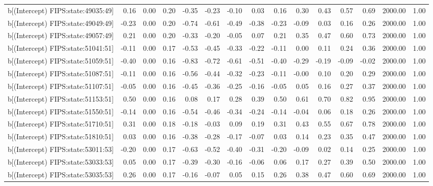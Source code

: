 \begin{table}[ht]
\begin{tabular}{rrrrrrrrrrrrrrr}
  b[(Intercept) FIPS:state:49035:49] & 0.16 & 0.00 & 0.20 & -0.35 & -0.23 & -0.10 & 0.03 & 0.16 & 0.30 & 0.43 & 0.57 & 0.69 & 2000.00 & 1.00 \\ 
  b[(Intercept) FIPS:state:49049:49] & -0.23 & 0.00 & 0.20 & -0.74 & -0.61 & -0.49 & -0.38 & -0.23 & -0.09 & 0.03 & 0.16 & 0.26 & 2000.00 & 1.00 \\ 
  b[(Intercept) FIPS:state:49057:49] & 0.21 & 0.00 & 0.20 & -0.33 & -0.20 & -0.05 & 0.07 & 0.21 & 0.35 & 0.47 & 0.60 & 0.73 & 2000.00 & 1.00 \\ 
  b[(Intercept) FIPS:state:51041:51] & -0.11 & 0.00 & 0.17 & -0.53 & -0.45 & -0.33 & -0.22 & -0.11 & 0.00 & 0.11 & 0.24 & 0.36 & 2000.00 & 1.00 \\ 
  b[(Intercept) FIPS:state:51059:51] & -0.40 & 0.00 & 0.16 & -0.83 & -0.72 & -0.61 & -0.51 & -0.40 & -0.29 & -0.19 & -0.09 & -0.02 & 2000.00 & 1.00 \\ 
  b[(Intercept) FIPS:state:51087:51] & -0.11 & 0.00 & 0.16 & -0.56 & -0.44 & -0.32 & -0.23 & -0.11 & -0.00 & 0.10 & 0.20 & 0.29 & 2000.00 & 1.00 \\ 
  b[(Intercept) FIPS:state:51107:51] & -0.05 & 0.00 & 0.16 & -0.45 & -0.36 & -0.25 & -0.16 & -0.05 & 0.05 & 0.16 & 0.27 & 0.37 & 2000.00 & 1.00 \\ 
  b[(Intercept) FIPS:state:51153:51] & 0.50 & 0.00 & 0.16 & 0.08 & 0.17 & 0.28 & 0.39 & 0.50 & 0.61 & 0.70 & 0.82 & 0.95 & 2000.00 & 1.00 \\ 
  b[(Intercept) FIPS:state:51550:51] & -0.14 & 0.00 & 0.16 & -0.54 & -0.46 & -0.34 & -0.24 & -0.14 & -0.04 & 0.06 & 0.18 & 0.26 & 2000.00 & 1.00 \\ 
  b[(Intercept) FIPS:state:51710:51] & 0.31 & 0.00 & 0.18 & -0.18 & -0.03 & 0.09 & 0.19 & 0.31 & 0.43 & 0.55 & 0.67 & 0.78 & 2000.00 & 1.00 \\ 
  b[(Intercept) FIPS:state:51810:51] & 0.03 & 0.00 & 0.16 & -0.38 & -0.28 & -0.17 & -0.07 & 0.03 & 0.14 & 0.23 & 0.35 & 0.47 & 2000.00 & 1.00 \\ 
  b[(Intercept) FIPS:state:53011:53] & -0.20 & 0.00 & 0.17 & -0.63 & -0.52 & -0.40 & -0.31 & -0.20 & -0.09 & 0.02 & 0.14 & 0.25 & 2000.00 & 1.00 \\ 
  b[(Intercept) FIPS:state:53033:53] & 0.05 & 0.00 & 0.17 & -0.39 & -0.30 & -0.16 & -0.06 & 0.06 & 0.17 & 0.27 & 0.39 & 0.50 & 2000.00 & 1.00 \\ 
  b[(Intercept) FIPS:state:53035:53] & 0.26 & 0.00 & 0.17 & -0.16 & -0.07 & 0.05 & 0.15 & 0.26 & 0.38 & 0.47 & 0.60 & 0.69 & 2000.00 & 1.00 \\ 

\end{tabular}
\end{table}
